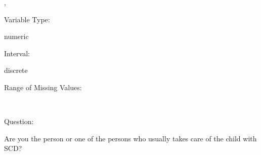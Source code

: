 \documentclass[
]{article}
\begin{document}
,

\begin{minipage}[t]{0.3\linewidth}

\colorbox{mypink1}{}

\end{minipage}%
\begin{minipage}[t]{0.7\linewidth}

\colorbox{mypink1}{\makebox[\textwidth]{\strut\bfseries\color{black}  
 }}

\end{minipage}

\begin{minipage}[t]{0.3\linewidth}

Variable Type:

\end{minipage}%
\begin{minipage}[t]{0.7\linewidth}

numeric

\end{minipage}

\begin{minipage}[t]{0.3\linewidth}

Interval:

\end{minipage}%
\begin{minipage}[t]{0.7\linewidth}

discrete

\end{minipage}

\begin{minipage}[t]{0.3\linewidth}

Range of Missing Values:

\end{minipage}%
\begin{minipage}[t]{0.7\linewidth}

~

\end{minipage}

\begin{minipage}[t]{0.3\linewidth}

Question:

\end{minipage}%
\begin{minipage}[t]{0.7\linewidth}

Are you the person or one of the persons who usually takes care of the
child with SCD?

\end{minipage}
\end{document}
